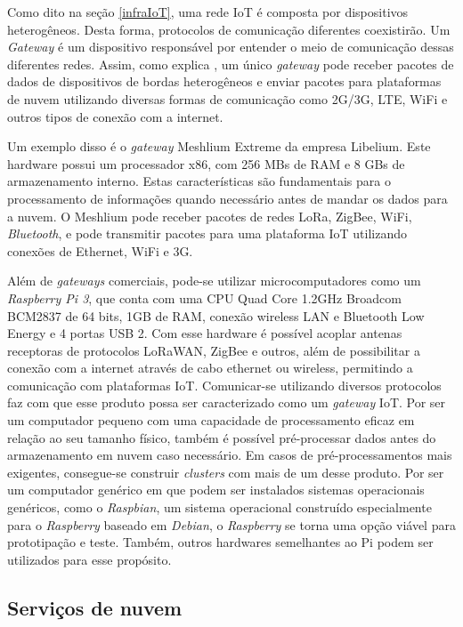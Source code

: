 \documentclass[
    hidelinks,
	12pt,				%
	openany,
	oneside, 
	a4paper,			%
	english,			%
	french,				%
	spanish,			%
	brazil				%
	]{abntex2}
\begin{document}
Como dito na seção \ref{infraIoT}, uma rede IoT é composta por dispositivos heterogêneos. Desta forma, protocolos de comunicação diferentes coexistirão. Um \textit{Gateway} é um dispositivo responsável por entender o meio de comunicação dessas diferentes redes. Assim, como explica \cite{haochen2011iotGatewayIntro}, um único \textit{gateway} pode receber pacotes de dados de dispositivos de bordas heterogêneos e enviar pacotes para plataformas de nuvem utilizando diversas formas de comunicação como 2G/3G, LTE, WiFi e outros tipos de conexão com a internet.

Um exemplo disso é o \textit{gateway} Meshlium Extreme da empresa Libelium. Este hardware possui um processador x86, com 256 MBs de RAM e 8 GBs de armazenamento interno. Estas características são fundamentais para o processamento de informações quando necessário antes de mandar os dados para a nuvem. O Meshlium pode receber pacotes de redes LoRa, ZigBee, WiFi, \textit{Bluetooth}, e pode transmitir pacotes para uma plataforma IoT utilizando conexões de Ethernet, WiFi e 3G.

Além de \textit{gateways} comerciais, pode-se utilizar microcomputadores como um \textit{Raspberry Pi 3}, que conta com uma CPU Quad Core 1.2GHz Broadcom BCM2837 de  64 bits, 1GB de RAM, conexão wireless LAN e Bluetooth Low Energy e 4 portas USB 2. Com esse hardware é possível acoplar antenas receptoras de protocolos LoRaWAN, ZigBee e outros, além de possibilitar a conexão com a internet através de cabo ethernet ou wireless, permitindo a comunicação com plataformas IoT. Comunicar-se utilizando diversos protocolos faz com que esse produto possa ser caracterizado como um \textit{gateway} IoT. Por ser um computador pequeno com uma capacidade de processamento eficaz em relação ao seu tamanho físico, também é possível pré-processar dados antes do armazenamento em nuvem caso necessário. Em casos de pré-processamentos mais exigentes, consegue-se construir \textit{clusters} com mais de um desse produto. Por ser um computador genérico em que podem ser instalados sistemas operacionais genéricos, como o \textit{Raspbian}, um sistema operacional construído especialmente para o \textit{Raspberry} baseado em \textit{Debian}, o \textit{Raspberry} se torna uma opção viável para prototipação e teste. Também, outros hardwares semelhantes ao Pi podem ser utilizados para esse propósito.

\subsection{Serviços de nuvem} \label{aws}
\end{document}
